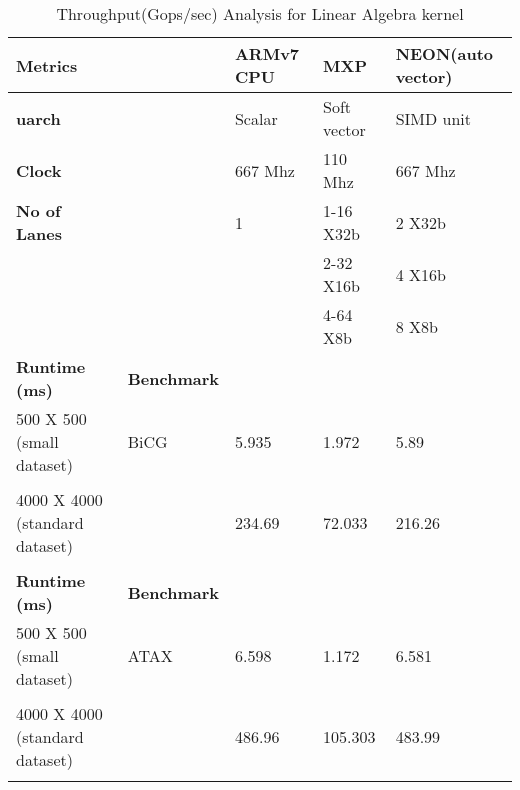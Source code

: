 

\begin{table}[htbp]
	\centering
	\begin{adjustbox}{width= .8\textwidth}
		\small
		\begin{tabular}{rrrrr}
			\toprule
			\multicolumn{1}{l}{\textbf{Metrics}} &   & \multicolumn{1}{l}{\textbf{ARMv7 CPU}} & \multicolumn{1}{l}{\textbf{MXP}} & \multicolumn{1}{l}{\textbf{NEON(auto vector)}} \\
			\midrule
			\multicolumn{1}{l}{\textbf{uarch}} &   & \multicolumn{1}{l}{Scalar} & \multicolumn{1}{l}{Soft vector} & \multicolumn{1}{l}{SIMD unit} \\
			\multicolumn{1}{l}{\textbf{Clock}} &   & \multicolumn{1}{l}{667 Mhz} & \multicolumn{1}{l}{110 Mhz} & \multicolumn{1}{l}{667 Mhz} \\
			\multicolumn{1}{l}{\textbf{No of Lanes}} &   & \multicolumn{1}{l}{1} & \multicolumn{1}{l}{1-16 X32b} & \multicolumn{1}{l}{2 X32b} \\
			&   &   & \multicolumn{1}{l}{2-32 X16b} & \multicolumn{1}{l}{4 X16b} \\
			&   &   & \multicolumn{1}{l}{4-64 X8b} & \multicolumn{1}{l}{8 X8b} \\
			\midrule
			\multicolumn{1}{l}{\textbf{Runtime (ms)}} & \multicolumn{1}{l}{\textbf{Benchmark}} &   &   &  \\
			\midrule
			\multicolumn{1}{l}{500 X 500 (small dataset)} & \multicolumn{1}{l}{BiCG} & \multicolumn{1}{l}{5.935} & \multicolumn{1}{l}{1.972} & \multicolumn{1}{l}{5.89} \\
			&   &   &   &  \\
			\multicolumn{1}{l}{4000 X 4000 (standard dataset)} &   & \multicolumn{1}{l}{234.69} & \multicolumn{1}{l}{72.033} & \multicolumn{1}{l}{216.26} \\
			&   &   &   &  \\
			\midrule
			\multicolumn{1}{l}{\textbf{Runtime (ms)}} & \multicolumn{1}{l}{\textbf{Benchmark}} &   &   &  \\
			\midrule
			\multicolumn{1}{l}{500 X 500 (small dataset)} & \multicolumn{1}{l}{ATAX} & \multicolumn{1}{l}{6.598} & \multicolumn{1}{l}{1.172} & \multicolumn{1}{l}{6.581} \\
			&   &   &   &  \\
			\multicolumn{1}{l}{4000 X 4000 (standard dataset)} &   & \multicolumn{1}{l}{486.96} & \multicolumn{1}{l}{105.303} & \multicolumn{1}{l}{483.99} \\
			&   &   &   &  \\
			\bottomrule
		\end{tabular}%
	\end{adjustbox}%
	\caption{Throughput(Gops/sec) Analysis for Linear Algebra kernel}
	\label{lin:a}%
\end{table}%
